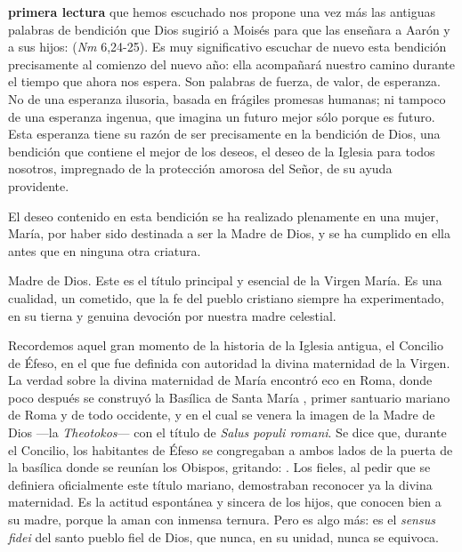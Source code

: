 \begin{body}
	 \textbf{primera lectura} que hemos escuchado nos propone una vez más las antiguas palabras de bendición que Dios sugirió a Moisés para que las enseñara a Aarón y a sus hijos:  (\emph{Nm} 6,24-25). Es muy significativo escuchar de nuevo esta bendición precisamente al comienzo del nuevo año: ella acompañará nuestro camino durante el tiempo que ahora nos espera. Son palabras de fuerza, de valor, de esperanza. No de una esperanza ilusoria, basada en frágiles promesas humanas; ni tampoco de una esperanza ingenua, que imagina un futuro mejor sólo porque es futuro. Esta esperanza tiene su razón de ser precisamente en la bendición de Dios, una bendición que contiene el mejor de los deseos, el deseo de la Iglesia para todos nosotros, impregnado de la protección amorosa del Señor, de su ayuda providente.
	
	El deseo contenido en esta bendición se ha realizado plenamente en una mujer, María, por haber sido destinada a ser la Madre de Dios, y se ha cumplido en ella antes que en ninguna otra criatura.
	
	Madre de Dios. Este es el título principal y esencial de la Virgen María. Es una cualidad, un cometido, que la fe del pueblo cristiano siempre ha experimentado, en su tierna y genuina devoción por nuestra madre celestial.
	
	Recordemos aquel gran momento de la historia de la Iglesia antigua, el Concilio de Éfeso, en el que fue definida con autoridad la divina maternidad de la Virgen. La verdad sobre la divina maternidad de María encontró eco en Roma, donde poco después se construyó la Basílica de Santa María , primer santuario mariano de Roma y de todo occidente, y en el cual se venera la imagen de la Madre de Dios ---la \emph{Theotokos}--- con el título de \emph{Salus populi romani}. Se dice que, durante el Concilio, los habitantes de Éfeso se congregaban a ambos lados de la puerta de la basílica donde se reunían los Obispos, gritando: . Los fieles, al pedir que se definiera oficialmente este título mariano, demostraban reconocer ya la divina maternidad. Es la actitud espontánea y sincera de los hijos, que conocen bien a su madre, porque la aman con inmensa ternura. Pero es algo más: es el \emph{sensus fidei} del santo pueblo fiel de Dios, que nunca, en su unidad, nunca se equivoca.
	

\end{body}
